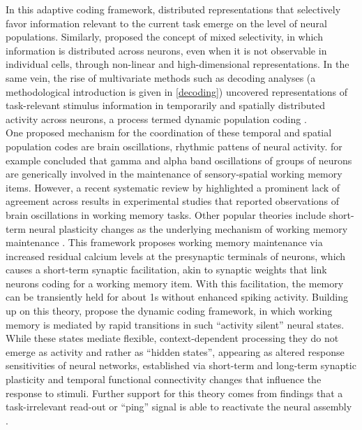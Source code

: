 In this adaptive coding framework, distributed representations that selectively favor information relevant to the current task emerge on the level of neural populations.
Similarly, \citet{rigotti2013importance} proposed the concept of mixed selectivity, in which information is distributed across neurons, even when it is not observable in individual cells, through non-linear and high-dimensional representations.
In the same vein, the rise of multivariate methods such as decoding analyses (a methodological introduction is given in \ref{decoding}) uncovered representations of task-relevant stimulus information in temporarily and spatially distributed activity across neurons, a process termed dynamic population coding \citep{sreenivasan2014revisiting}.\\
One proposed mechanism for the coordination of these temporal and spatial population codes are brain oscillations, rhythmic pattens of neural activity.
\citet{roux2014working} for example concluded that gamma and alpha band oscillations of groups of neurons are generically involved in the maintenance of sensory-spatial working memory items.
However, a recent systematic review by \citet{pavlov2022oscillatory} highlighted a prominent lack of agreement across results in experimental studies that reported observations of brain oscillations in working memory tasks.
Other popular theories include short-term neural plasticity changes as the underlying mechanism of working memory maintenance \citep{mongillo2008synaptic}.
This framework proposes working memory maintenance via increased residual calcium levels at the presynaptic terminals of neurons, which causes a short-term synaptic facilitation, akin to synaptic weights that link neurons coding for a working memory item.
With this facilitation, the memory can be transiently held for about 1s without enhanced spiking activity.
Building up on this theory,  \citet{stokes2013dynamic, stokes2015activity} propose the dynamic coding framework, in which working memory is mediated by rapid transitions in such ``activity silent'' neural states.
While these states mediate flexible, context-dependent processing they do not emerge as activity and rather as ``hidden states'', appearing as altered response sensitivities of neural networks, established via short-term and long-term synaptic plasticity and temporal functional connectivity changes that influence the response to stimuli.
Further support for this theory comes from findings that a task-irrelevant read-out or ``ping'' signal is able to reactivate the neural assembly \citep{trubutschek2017theory, wolff2017dynamic}.\\
